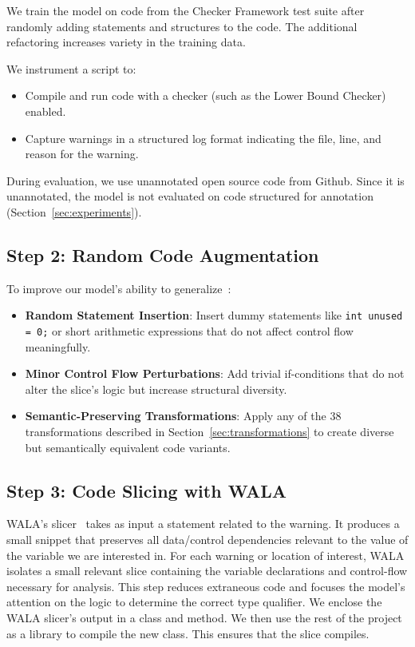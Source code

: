 \documentclass[acmsmall,screen,review,anonymous]{acmart}
\newcommand{\cf}{Checker Framework\xspace}
\begin{document}
We train the model on code from the \cf test suite after randomly adding statements and structures to the code. The additional refactoring increases variety in the training data.

We instrument a script to:
\begin{itemize}
    \item Compile and run code with a checker (such as the Lower Bound Checker) enabled.
    \item Capture warnings in a structured log format indicating the file, line, and reason for the warning.
\end{itemize}

During evaluation, we use unannotated open source code from Github. Since it is unannotated, the model is not evaluated on code structured for annotation (Section~\ref{sec:experiments}).

\subsection{Step 2: Random Code Augmentation}
\label{sec:step2}

To improve our model's ability to generalize~\cite{bengio2017deep}:

\begin{itemize}
    \item \textbf{Random Statement Insertion}: Insert dummy statements like \texttt{int unused = 0;} or short arithmetic expressions that do not affect control flow meaningfully.
    
    \item \textbf{Minor Control Flow Perturbations}: Add trivial if-conditions that do not alter the slice's logic but increase structural diversity.
    
    \item \textbf{Semantic-Preserving Transformations}: Apply any of the 38 transformations described in Section~\ref{sec:transformations} to create diverse but semantically equivalent code variants.
\end{itemize}

\subsection{Step 3: Code Slicing with WALA}
\label{sec:step3}

WALA's slicer~\cite{wala} takes as input a statement related to the warning. It produces a small snippet that preserves all data/control dependencies relevant to the value of the variable we are interested in. For each warning or location of interest, WALA isolates a small relevant slice containing the variable declarations and control-flow necessary for analysis. This step reduces extraneous code and focuses the model's attention on the logic to determine the correct type qualifier. We enclose the WALA slicer's output in a class and method. We then use the rest of the project as a library to compile the new class. This ensures that the slice compiles.
\end{document}
